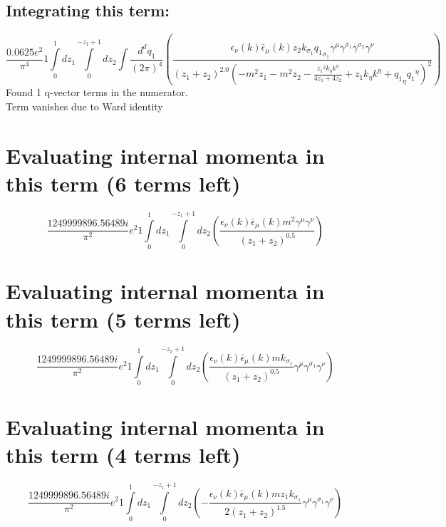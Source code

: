 \subsection*{Integrating this term:}
\begin{dmath}\frac{0.0625 e^{2}}{\pi^{4}}1\int\limits_{ 0 }^{ 1 } d{ z_{ 1 } }\int\limits_{ 0 }^{ - { z_{ 1 } } + 1 } d{ z_{ 2 } }\int\frac{d^d q_1 }{ (2\pi)^4 }\left(\frac{\epsilon_{ \nu }({ k }) \bar{\epsilon}_{ \mu }({ k }) { z_{ 2 } } { { k }_{ \sigma_1 } } { { q_1 }_{ \sigma_1 } } { \gamma^{ \mu } } { \gamma^{ \sigma_1 } } { \gamma^{ \sigma_2 } } { \gamma^{ \nu } }}{\left({ z_{ 1 } } + { z_{ 2 } }\right)^{2.0} \left(- m^{2} { z_{ 1 } } - m^{2} { z_{ 2 } } - \frac{{ z_{ 1 } }^{2} { { k }_{ \eta } } { { k }^{ \eta } }}{4 { z_{ 1 } } + 4 { z_{ 2 } }} + { z_{ 1 } } { { k }_{ \eta } } { { k }^{ \eta } } + { { q_1 }_{ \eta } } { { q_1 }^{ \eta } }\right)^{2}}\right)\end{dmath}
Found 1 q-vector terms in the numerator.\\
Term vanishes due to Ward identity\\
\section*{Evaluating internal momenta in this term (6 terms left)}
\begin{dmath}\frac{1249999896.56489 i}{\pi^{2}} e^{2}1\int\limits_{ 0 }^{ 1 } d{ z_{ 1 } }\int\limits_{ 0 }^{ - { z_{ 1 } } + 1 } d{ z_{ 2 } }\left(\frac{\epsilon_{ \nu }({ k }) \bar{\epsilon}_{ \mu }({ k }) m^{2} { \gamma^{ \mu } } { \gamma^{ \nu } }}{\left({ z_{ 1 } } + { z_{ 2 } }\right)^{0.5}}\right)\end{dmath}
\section*{Evaluating internal momenta in this term (5 terms left)}
\begin{dmath}\frac{1249999896.56489 i}{\pi^{2}} e^{2}1\int\limits_{ 0 }^{ 1 } d{ z_{ 1 } }\int\limits_{ 0 }^{ - { z_{ 1 } } + 1 } d{ z_{ 2 } }\left(\frac{\epsilon_{ \nu }({ k }) \bar{\epsilon}_{ \mu }({ k }) m { { k }_{ \sigma_1 } }}{\left({ z_{ 1 } } + { z_{ 2 } }\right)^{0.5}} { \gamma^{ \mu } } { \gamma^{ \sigma_1 } } { \gamma^{ \nu } }\right)\end{dmath}
\section*{Evaluating internal momenta in this term (4 terms left)}
\begin{dmath}\frac{1249999896.56489 i}{\pi^{2}} e^{2}1\int\limits_{ 0 }^{ 1 } d{ z_{ 1 } }\int\limits_{ 0 }^{ - { z_{ 1 } } + 1 } d{ z_{ 2 } }\left(- \frac{\epsilon_{ \nu }({ k }) \bar{\epsilon}_{ \mu }({ k }) m { z_{ 1 } } { { k }_{ \sigma_1 } }}{2 \left({ z_{ 1 } } + { z_{ 2 } }\right)^{1.5}} { \gamma^{ \mu } } { \gamma^{ \sigma_1 } } { \gamma^{ \nu } }\right)\end{dmath}
